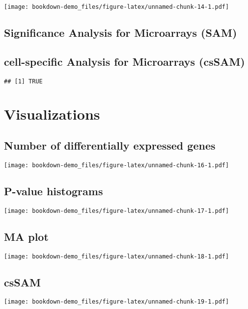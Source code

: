 \documentclass[]{book}
\begin{document}
\texttt{[image: bookdown-demo\_files/figure-latex/unnamed-chunk-14-1.pdf]}

\subsection{Significance Analysis for Microarrays
(SAM)}\label{significance-analysis-for-microarrays-sam}

\subsection{cell-specific Analysis for Microarrays
(csSAM)}\label{cell-specific-analysis-for-microarrays-cssam}

\begin{verbatim}
## [1] TRUE
\end{verbatim}

\section{Visualizations}\label{visualizations-1}

\subsection{Number of differentially expressed
genes}\label{number-of-differentially-expressed-genes}

\texttt{[image: bookdown-demo\_files/figure-latex/unnamed-chunk-16-1.pdf]}

\subsection{P-value histograms}\label{p-value-histograms}

\texttt{[image: bookdown-demo\_files/figure-latex/unnamed-chunk-17-1.pdf]}

\subsection{MA plot}\label{ma-plot}

\texttt{[image: bookdown-demo\_files/figure-latex/unnamed-chunk-18-1.pdf]}

\subsection{csSAM}\label{cssam}

\texttt{[image: bookdown-demo\_files/figure-latex/unnamed-chunk-19-1.pdf]}
\end{document}
